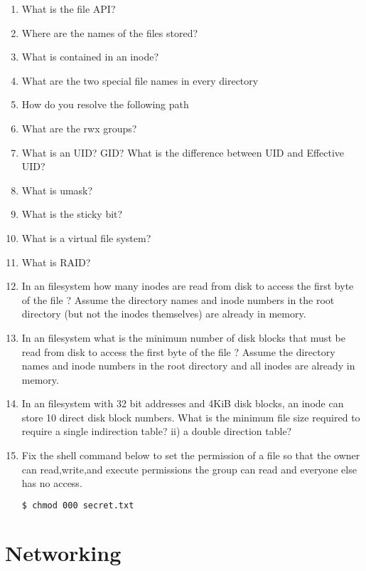 \begin{enumerate}
\item What is the file API?
\item Where are the names of the files stored?
\item What is contained in an inode?
\item What are the two special file names in every directory
\item How do you resolve the following path 
\item What are the rwx groups?
\item What is an UID? GID? What is the difference between UID and Effective UID?
\item What is umask?
\item What is the sticky bit?
\item What is a virtual file system?
\item What is RAID?
\item In an  filesystem how many inodes are read from disk to access the first byte of the file  ? Assume the directory names and inode numbers in the root directory (but not the inodes themselves) are already in memory.

\item In an  filesystem what is the minimum number of disk blocks that must be read from disk to access the first byte of the file  ? Assume the directory names and inode numbers in the root directory and all inodes are already in memory.

\item In an  filesystem with 32 bit addresses and 4KiB disk blocks, an inode can store 10 direct disk block numbers. What is the minimum file size required to require a single indirection table? ii) a double direction table?

\item Fix the shell command  below to set the permission of a file  so that the owner can read,write,and execute permissions the group can read and everyone else has no access.

\begin{lstlisting}[language=bash]
$ chmod 000 secret.txt
\end{lstlisting}

\end{enumerate}

\section{Networking}

